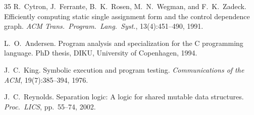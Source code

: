 \documentclass[10pt,a4paper]{article}
\begin{document}
\begin{thebibliography}{35}
R.~Cytron, J.~Ferrante, B.~K.~Rosen, M.~N.~Wegman, and F.~K.~Zadeck.
\newblock Efficiently computing static single assignment form and the control dependence graph.
\newblock \emph{ACM Trans.\ Program.\ Lang.\ Syst.}, 13(4):451--490, 1991.

L.~O.~Andersen.
\newblock Program analysis and specialization for the {C} programming language.
\newblock PhD thesis, DIKU, University of Copenhagen, 1994.

J.~C.~King.
\newblock Symbolic execution and program testing.
\newblock \emph{Communications of the ACM}, 19(7):385--394, 1976.

J.~C.~Reynolds.
\newblock Separation logic: A logic for shared mutable data structures.
\newblock \emph{Proc.\ LICS}, pp.\ 55--74, 2002.

\end{thebibliography}
\end{document}
